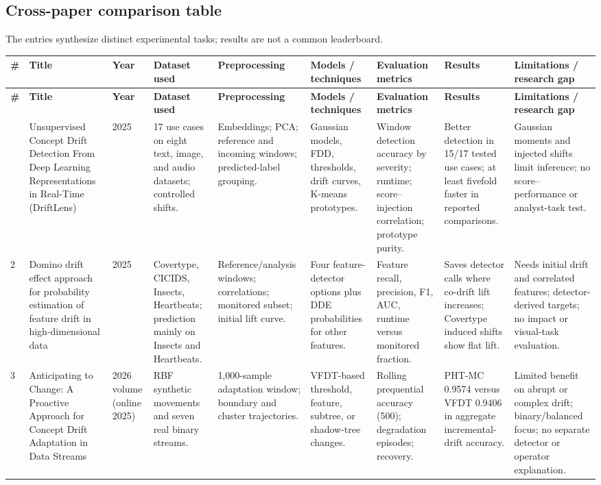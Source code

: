 \documentclass[10pt,a4paper]{article}
\renewcommand{\arraystretch}{1.1}
\begin{document}
\clearpage
\begin{landscape}
\section*{Cross-paper comparison table}
\noindent\footnotesize The entries synthesize distinct experimental tasks; results are not a common leaderboard.
\vspace{3pt}
\small
\renewcommand{\arraystretch}{1.1}
\begin{longtable}{L{0.45cm}L{3.05cm}L{1.15cm}L{2.95cm}L{3.05cm}L{2.95cm}L{2.95cm}L{3.0cm}L{3.95cm}}
\toprule
{}\textbf{\#} & \textbf{Title} & \textbf{Year} & \textbf{Dataset used} & \textbf{Preprocessing} & \textbf{Models / techniques} & \textbf{Evaluation metrics} & \textbf{Results} & \textbf{Limitations / research gap}\\
\midrule\endfirsthead
{}\textbf{\#} & \textbf{Title} & \textbf{Year} & \textbf{Dataset used} & \textbf{Preprocessing} & \textbf{Models / techniques} & \textbf{Evaluation metrics} & \textbf{Results} & \textbf{Limitations / research gap}\\
\midrule\endhead
\bottomrule{} & Unsupervised Concept Drift Detection From Deep Learning Representations in Real-Time (DriftLens) & 2025 & 17 use cases on eight text, image, and audio datasets; controlled shifts. & Embeddings; PCA; reference and incoming windows; predicted-label grouping. & Gaussian models, FDD, thresholds, drift curves, K-means prototypes. & Window detection accuracy by severity; runtime; score--injection correlation; prototype purity. & Better detection in 15/17 tested use cases; at least fivefold faster in reported comparisons. & Gaussian moments and injected shifts limit inference; no score--performance or analyst-task test.\\[5pt]
2 & Domino drift effect approach for probability estimation of feature drift in high-dimensional data & 2025 & Covertype, CICIDS, Insects, Heartbeats; prediction mainly on Insects and Heartbeats. & Reference/analysis windows; correlations; monitored subset; initial lift curve. & Four feature-detector options plus DDE probabilities for other features. & Feature recall, precision, F1, AUC, runtime versus monitored fraction. & Saves detector calls where co-drift lift increases; Covertype induced shifts show flat lift. & Needs initial drift and correlated features; detector-derived targets; no impact or visual-task evaluation.\\[5pt]
3 & Anticipating to Change: A Proactive Approach for Concept Drift Adaptation in Data Streams & 2026 volume (online 2025) & RBF synthetic movements and seven real binary streams. & 1,000-sample adaptation window; boundary and cluster trajectories. & VFDT-based threshold, feature, subtree, or shadow-tree changes. & Rolling prequential accuracy (500); degradation episodes; recovery. & PHT-MC 0.9574 versus VFDT 0.9406 in aggregate incremental-drift accuracy. & Limited benefit on abrupt or complex drift; binary/balanced focus; no separate detector or operator explanation.\\
\end{longtable}
\end{landscape}
\end{document}
